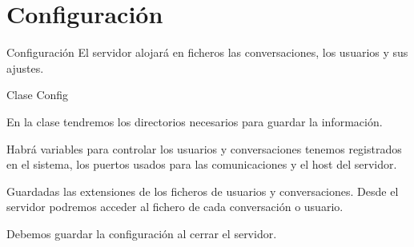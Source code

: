 \section{Configuración}
\begin{frame}{Configuración}
			El servidor alojará en ficheros las conversaciones, los usuarios y sus ajustes.
	\begin{block}{Clase Config}

		En la clase tendremos los
		directorios necesarios para guardar la información.
		
		Habrá variables para controlar los usuarios y conversaciones tenemos registrados en el sistema, los puertos usados para las comunicaciones y el host del servidor. 
	\end{block}
	
	\begin{block}{ }
		Guardadas las extensiones de los ficheros de usuarios y conversaciones. Desde el servidor podremos acceder al fichero de cada conversación o usuario.

		Debemos guardar la configuración al cerrar el servidor.

	\end{block}
\end{frame}


